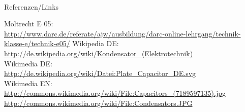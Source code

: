 \hypertarget{refs}{}
\textcolor{white}{} \\ %
\Large Referenzen/Links
\footnotesize

\begin{thebibliography}{}
       Moltrecht E 05: \\
                    \url{http://www.darc.de/referate/ajw/ausbildung/darc-online-lehrgang/technik-klasse-e/technik-e05/}
        Wikipedia DE: \\
                    \url{http://de.wikipedia.org/wiki/Kondensator_(Elektrotechnik)}\\ 
    	Wikimedia DE:\\
    				\url{http://de.wikipedia.org/wiki/Datei:Plate_Capacitor_DE.svg}\\
   		Wikimedia EN:\\
   					\url{http://commons.wikimedia.org/wiki/File:Capacitors_(7189597135).jpg}\\
   					\url{http://commons.wikimedia.org/wiki/File:Condensators.JPG}
\end{thebibliography} 


